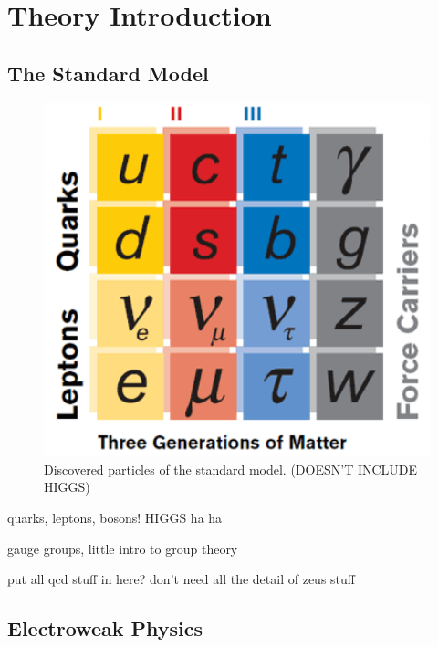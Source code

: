 \chapter{Theory Introduction}  %
\label{theory}

\section{The Standard Model}
\label{theory:SM}


 \begin{figure}[htb]
  \begin{center}
    \includegraphics[width=360pt]{Figures/theory-standard-model-symmetry-mag.png}
  \end{center}
  \caption[Discovered particles of the standard model]
	  {Discovered particles of the standard model. 
	    (DOESN'T INCLUDE HIGGS)}
  \label{fig:StandardModel}
 \end{figure}


quarks, leptons, bosons!  HIGGS ha ha

gauge groups, little intro to group theory

put all qcd stuff in here?  don't need all the detail of zeus stuff

\section{Electroweak Physics}
\label{theory:EWK}

